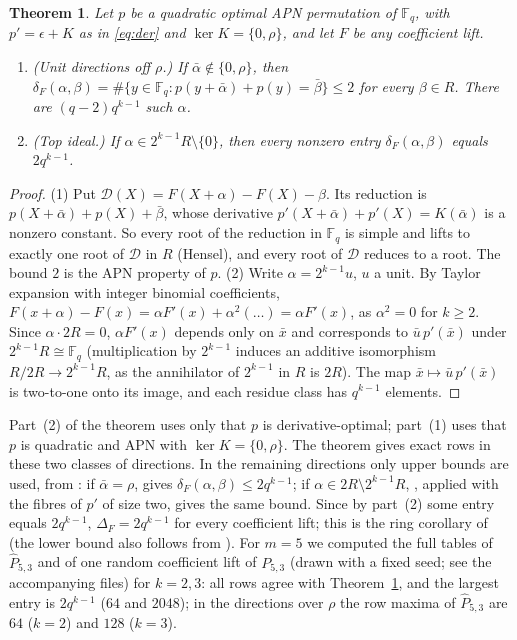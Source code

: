\documentclass[preprint,12pt]{elsarticle}
\newtheorem{theorem}{Theorem}[section]
\theoremstyle{definition}
\newcommand{\F}{\mathbb{F}}
\begin{document}
\begin{theorem}\label{thm:R}
Let $p$ be a quadratic optimal APN permutation of $\F_q$, with $p'=\epsilon+K$ as in \eqref{eq:der} and $\ker K=\{0,\rho\}$, and let $F$ be any coefficient lift.
\begin{enumerate}
\item (Unit directions off $\rho$.) If $\bar\alpha\notin\{0,\rho\}$, then $\delta_F(\alpha,\beta)=\#\{y\in\F_q:p(y+\bar\alpha)+p(y)=\bar\beta\}\le2$ for every $\beta\in R$. There are $(q-2)q^{k-1}$ such $\alpha$.
\item (Top ideal.) If $\alpha\in2^{k-1}R\setminus\{0\}$, then every nonzero entry $\delta_F(\alpha,\beta)$ equals $2q^{k-1}$.
\end{enumerate}
\end{theorem}
\begin{proof}
(1) Put $\mathcal D(X)=F(X+\alpha)-F(X)-\beta$. Its reduction is $p(X+\bar\alpha)+p(X)+\bar\beta$, whose derivative $p'(X+\bar\alpha)+p'(X)=K(\bar\alpha)$ is a nonzero constant. So every root of the reduction in $\F_q$ is simple and lifts to exactly one root of $\mathcal D$ in $R$ (Hensel), and every root of $\mathcal D$ reduces to a root. The bound $2$ is the APN property of $p$.
(2) Write $\alpha=2^{k-1}u$, $u$ a unit. By Taylor expansion with integer binomial coefficients, $F(x+\alpha)-F(x)=\alpha F'(x)+\alpha^2(\dots)=\alpha F'(x)$, as $\alpha^2=0$ for $k\ge2$. Since $\alpha\cdot2R=0$, $\alpha F'(x)$ depends only on $\bar x$ and corresponds to $\bar u\,p'(\bar x)$ under $2^{k-1}R\cong\F_q$ (multiplication by $2^{k-1}$ induces an additive isomorphism $R/2R\to2^{k-1}R$, as the annihilator of $2^{k-1}$ in $R$ is $2R$). The map $\bar x\mapsto\bar u\,p'(\bar x)$ is two-to-one onto its image, and each residue class has $q^{k-1}$ elements.
\end{proof}
Part~(2) of the theorem uses only that $p$ is derivative-optimal; part~(1) uses that $p$ is quadratic and APN with $\ker K=\{0,\rho\}$. The theorem gives exact rows in these two classes of directions. In the remaining directions only upper bounds are used, from \cite{RS}: if $\bar\alpha=\rho$, \cite[Prop.~4(1)]{RS} gives $\delta_F(\alpha,\beta)\le2q^{k-1}$; if $\alpha\in2R\setminus2^{k-1}R$, \cite[Prop.~5]{RS}, applied with the fibres of $p'$ of size two, gives the same bound. Since by part~(2) some entry equals $2q^{k-1}$, $\Delta_F=2q^{k-1}$ for every coefficient lift; this is the ring corollary of \cite{TIT} (the lower bound also follows from \cite[Thm.~3]{RS}). For $m=5$ we computed the full tables of $\hat P_{5,3}$ and of one random coefficient lift of $P_{5,3}$ (drawn with a fixed seed; see the accompanying files) for $k=2,3$: all rows agree with Theorem~\ref{thm:R}, and the largest entry is $2q^{k-1}$ ($64$ and $2048$); in the directions over $\rho$ the row maxima of $\hat P_{5,3}$ are $64$ ($k=2$) and $128$ ($k=3$).
\end{document}
